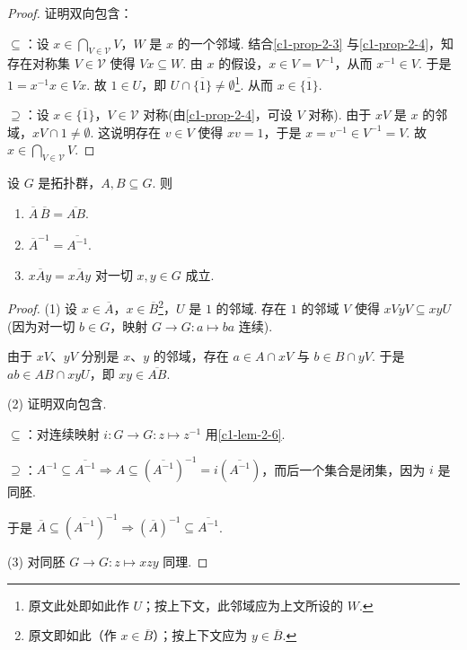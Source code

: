 \begin{proof}
证明双向包含：

$\subseteq$：设 $x\in\bigcap_{V\in\mathcal{V}}V$，$W$ 是 $x$ 的一个邻域. 结合\autoref{c1-prop-2-3} 与\autoref{c1-prop-2-4}，知存在对称集 $V\in\mathcal{V}$ 使得 $Vx\subseteq W$. 由 $x$ 的假设，$x\in V=V^{-1}$，从而 $x^{-1}\in V$. 于是 $1=x^{-1}x\in Vx$. 故 $1\in U$，即 $U\cap\overline{\{1\}}\neq\emptyset$\footnote{原文此处即如此作 $U$；按上下文，此邻域应为上文所设的 $W$.}. 从而 $x\in\overline{\{1\}}$.

$\supseteq$：设 $x\in\overline{\{1\}}$，$V\in\mathcal{V}$ 对称(由\autoref{c1-prop-2-4}，可设 $V$ 对称). 由于 $xV$ 是 $x$ 的邻域，$xV\cap 1\neq\emptyset$. 这说明存在 $v\in V$ 使得 $xv=1$，于是 $x=v^{-1}\in V^{-1}=V$. 故 $x\in\bigcap_{V\in\mathcal{V}}V$.
\end{proof}

\begin{proposition}\label{c1-prop-2-9}
设 $G$ 是拓扑群，$A,B\subseteq G$. 则
\begin{enumerate}[label=(\arabic*),leftmargin=*]
    \item $\overline{A}\,\overline{B}=\overline{AB}$.
    \item $\overline{A}^{-1}=\overline{A^{-1}}$.
    \item $x\overline{A}y=\overline{xAy}$ 对一切 $x,y\in G$ 成立.
\end{enumerate}
\end{proposition}

\begin{proof}
(1) 设 $x\in\overline{A}$，$x\in\overline{B}$\footnote{原文即如此（作 $x\in\overline{B}$）；按上下文应为 $y\in\overline{B}$.}，$U$ 是 $1$ 的邻域. 存在 $1$ 的邻域 $V$ 使得 $xVyV\subseteq xyU$ (因为对一切 $b\in G$，映射 $G\to G:a\mapsto ba$ 连续).

由于 $xV$、$yV$ 分别是 $x$、$y$ 的邻域，存在 $a\in A\cap xV$ 与 $b\in B\cap yV$. 于是 $ab\in AB\cap xyU$，即 $xy\in\overline{AB}$.

(2) 证明双向包含.

$\subseteq$：对连续映射 $i:G\to G:z\mapsto z^{-1}$ 用\autoref{c1-lem-2-6}.

$\supseteq$：$A^{-1}\subseteq\overline{A^{-1}}\Rightarrow A\subseteq(\overline{A^{-1}})^{-1}=i(\overline{A^{-1}})$，而后一个集合是闭集，因为 $i$ 是同胚.

于是 $\overline{A}\subseteq(\overline{A^{-1}})^{-1}\Rightarrow(\overline{A})^{-1}\subseteq\overline{A^{-1}}$.

(3) 对同胚 $G\to G:z\mapsto xzy$ 同理.
\end{proof}


